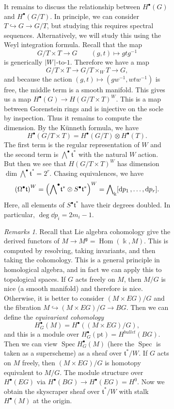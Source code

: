 \documentclass[leqno, openany]{memoir}
\theoremstyle{definition}
\theoremstyle{remark}
\newtheorem{rmks}[thm]{Remarks}
\theoremstyle{plain}
\theoremstyle{definition}
\theoremstyle{remark}
\renewcommand{\k}{\Bbbk}
\newcommand{\mf}[1]{\mathfrak{#1}}
\newcommand{\mr}[1]{\mathrm{#1}}
\DeclareMathOperator{\Hom}{Hom}
\DeclareMathOperator{\Spec}{Spec}
\begin{document}
\begin{figure}[H]
\begin{figure}[H]
It remains to discuss the relationship between $H^{\bullet}(G)$ and
$H^{\bullet}(G/T)$. In principle, we can consider $T \hookrightarrow G \to
G/T$, but studying this requires spectral sequences. Alternatively, we will
study this using the Weyl integration formula. Recall that the map \[ G/T
\times T \to G \qquad (g,t) \mapsto gtg^{-1} \] is generically
$\abs{W}$-to-$1$. Therefore we have a map \[ G/T \times T \to G/T \times_W T
\to G, \] and because the action $(g,t) \mapsto (gw^{-1}, wtw^{-1})$ is free,
the middle term is a smooth manifold. This gives us a map $H^{\bullet}(G) \to
{H(G/T \times T)}^W$. This is a map between Gorenstein rings and is injective
on the socle by inspection. Thus it remains to compute the dimension. By the
K\"unneth formula, we have \[ H^{\bullet}(G/T \times T) = H^{\bullet}(G/T)
\otimes H^{\bullet}(T). \] The first term is the regular representation of $W$
and the second term is $\bigwedge^{\bullet} \mf{t}^*$ with the natural $W$
action. But then we see that ${ H(G/T \times T) }^W$ has dimension $\dim
\bigwedge^{\bullet} \mf{t}^* = 2^r$. Chasing equivalences, we have \[
{(\Omega^{\bullet} \mf{t})}^W = {\qty({\bigwedge}^{\bullet} \mf{t}^* \otimes
S^{\bullet} \mf{t}^*)}^W = {\bigwedge}_{\k} [\dd{p_1}, \ldots, \dd{p_r}]. \]
Here, all elements of $S^{\bullet} \mf{t}^*$ have their degrees doubled. In
particular, $\deg \dd{p_i} = 2 m_i - 1$.

\begin{rmks} Recall that Lie algebra cohomology give the derived functors of $M
    \to M^{\mf{g}} = \Hom(\k, M)$. This is computed by resolving, taking
    invariants, and then taking the cohomology. This is a general principle in
    homological algebra, and in fact we can apply this to topological spaces.
    If $G$ acts freely on $M$, then $M/G$ is nice (a smooth manifold) and
    therefore is nice. Otherwise, it is better to consider $(M \times EG)/G$
    and the fibration $M \hookrightarrow (M \times EG)/G \to BG$. Then we can
    define the \textit{equivariant cohomology} \[ H^{\bullet}_G(M) =
    H^{\bullet}((M \times EG)/G), \] and this is a module over
    $H_G^{\bullet}(\mr{pt}) = H^{bullet}(BG)$. Then we can view $\Spec
    H_G^{\bullet}(M)$ (here the $\Spec$ is taken as a superscheme) as a sheaf
    over $\mf{t}^*/W$. If $G$ acts on $M$ freely, then $(M \times EG)/G$ is
    homotopy equivalent to $M/G$. The module structure over $H^{\bullet}(EG)$
    via $H^{\bullet}(BG) \to H^{\bullet}(EG) = H^0$. Now we obtain the
    skyscraper sheaf over $\mf{t}^*/W$ with stalk $H^{\bullet}(M)$ at the
    origin.


\end{rmks}
\end{figure}
\end{figure}
\end{document}
